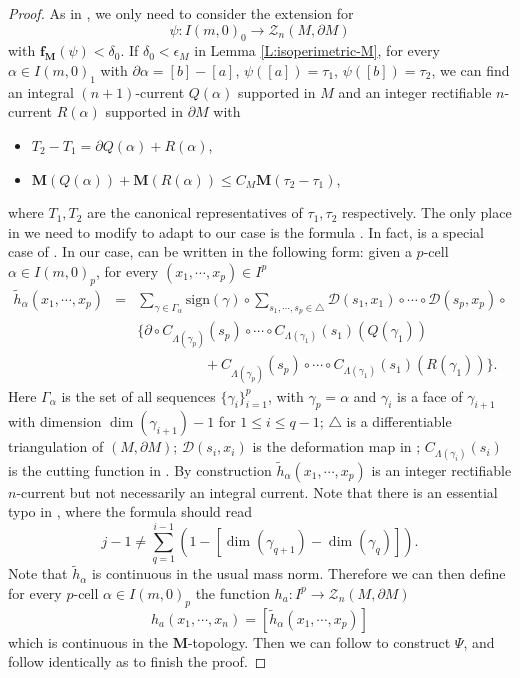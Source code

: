\documentclass[10pt]{amsart}
\theoremstyle{definition}
\theoremstyle{remark}
\numberwithin{equation}{section}
\newcommand{\al}{\alpha}
\newcommand{\La}{\Lambda}
\newcommand{\de}{\delta}
\newcommand{\ep}{\epsilon}
\newcommand{\Ga}{\Gamma}
\newcommand{\ga}{\gamma}
\newcommand{\ti}{\tilde}
\newcommand{\Z}{\mathcal{Z}}
\newcommand{\f}{\mathbf{f}}
\newcommand{\M}{\mathbf{M}}
\newcommand{\D}{\mathcal{D}}
\begin{document}
\begin{proof}
As in \cite[Theorem 14.1]{Marques-Neves14}, we only need to consider the extension for
$$\psi: I(m, 0)_0\rightarrow \Z_n(M, \partial M)$$
with $\f_\M(\psi) < \de_0$. If $\de_0 < \ep_M$ in Lemma \ref{L:isoperimetric-M}, for every $\al\in I(m, 0)_1$ with $\partial \al=[b]-[a]$, $\psi([a])=\tau_1$, $\psi([b])=\tau_2$, we can find an integral $(n+1)$-current $Q(\al)$ supported in $M$ and an integer rectifiable $n$-current $R(\al)$ supported in $\partial M$ with
\begin{itemize}
\item $T_2-T_1=\partial Q(\al)+R(\al)$, 
\item $\M(Q(\al))+\M(R(\al))\leq C_M \M(\tau_2-\tau_1)$,
\end{itemize}
where $T_1,T_2$ are the canonical representatives of $\tau_1, \tau_2$ respectively.
The only place in \cite[Theorem 14.1]{Marques-Neves14} we need to modify to adapt to our case is the formula \cite[(86)]{Marques-Neves14}. In fact, \cite[(86)]{Marques-Neves14} is a special case of \cite[Interpolation formula 6.3]{Almgren62}. In our case, \cite[Interpolation formula 6.3]{Almgren62} can be written in the following form: given a $p$-cell $\al\in I(m, 0)_p$, for every $(x_1, \cdots, x_p)\in I^p$
\begin{eqnarray*}
 \ti{h}_{\al}(x_1, \cdots, x_p)&=& \sum_{\ga\in\Ga_{\al}}\textrm{sign}(\ga) \circ \sum_{s_1,\cdots, s_p\in \triangle} \D(s_1, x_1)\circ\cdots\circ\D(s_p, x_p)\circ\\
&& \{\partial\circ C_{\La(\ga_p)}(s_p)\circ\cdots\circ C_{\La(\ga_1)}(s_1)(Q(\ga_1)) \\
&& \phantom{aaaaaaaaa} +C_{\La(\ga_p)}(s_p)\circ\cdots\circ C_{\La(\ga_1)}(s_1)(R(\ga_1))\}.
\end{eqnarray*}
Here $\Ga_{\al}$ is the set of all sequences $\{\ga_i\}_{i=1}^p$, with $\ga_p=\al$ and $\ga_i$ is a face of $\ga_{i+1}$ with dimension $\dim(\ga_{i+1})-1$ for $1\leq i\leq q-1$; $\triangle$ is a differentiable triangulation of $(M, \partial M)$; $\D(s_i, x_i)$ is the deformation map in \cite[(82)]{Marques-Neves14}\cite[\S 4.5]{Pitts}; $C_{\La(\ga_i)}(s_i)$ is the cutting function in \cite[Theorem 5.8]{Almgren62}\cite[page 762]{Marques-Neves14}. By construction $\ti{h}_\al(x_1, \cdots, x_p)$ is an integer rectifiable $n$-current but not necessarily an integral current. Note that there is an essential typo in \cite[Definition (6.2)(3)(c)]{Almgren62}, where the formula should read 
\[ j-1\neq \sum_{q=1}^{i-1}(1-[\dim(\ga_{q+1})-\dim(\ga_q)]).\]
Note that $\ti{h}_{\al}$ is continuous in the usual mass norm. Therefore we can then define for every $p$-cell $\al\in I(m, 0)_p$ the function $h_a: I^p\rightarrow \Z_n(M, \partial M)$
\[ h_a(x_1, \cdots, x_n)=[\ti{h}_{\al}(x_1, \cdots, x_p)] \]
which is continuous in the $\M$-topology. Then we can follow \cite[(6.5)]{Almgren62} to construct $\Psi$, and follow identically as \cite[page 763]{Marques-Neves14} to finish the proof.
\end{proof}
\end{document}
